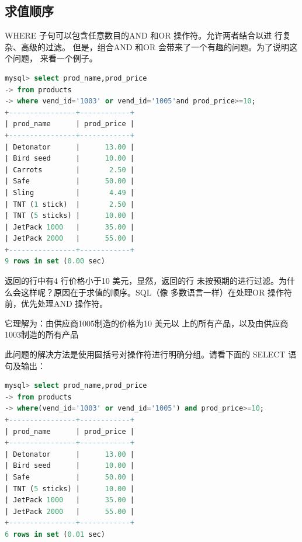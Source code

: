 \documentclass[11pt,a4paper,oneside]{book}
\begin{document}
\subsection{求值顺序}
WHERE 子句可以包含任意数目的AND 和OR 操作符。允许两者结合以进
行复杂、高级的过滤。
但是，组合AND 和OR 会带来了一个有趣的问题。为了说明这个问题，
来看一个例子。

\begin{lstlisting}[language=sql]
mysql> select prod_name,prod_price
-> from products
-> where vend_id='1003' or vend_id='1005'and prod_price>=10;
+----------------+------------+
| prod_name      | prod_price |
+----------------+------------+
| Detonator      |      13.00 |
| Bird seed      |      10.00 |
| Carrots        |       2.50 |
| Safe           |      50.00 |
| Sling          |       4.49 |
| TNT (1 stick)  |       2.50 |
| TNT (5 sticks) |      10.00 |
| JetPack 1000   |      35.00 |
| JetPack 2000   |      55.00 |
+----------------+------------+
9 rows in set (0.00 sec)
\end{lstlisting}
返回的行中有4 行价格小于10 美元，显然，返回的行
未按预期的进行过滤。为什么会这样呢？原因在于求值的顺序。SQL（像
多数语言一样）在处理OR 操作符前，优先处理AND 操作符。

它理解为：由供应商1005制造的价格为10 美元以
上的所有产品，以及由供应商1003制造的所有产品

此问题的解决方法是使用圆括号对操作符进行明确分组。请看下面的
SELECT 语句及输出：
\begin{lstlisting}[language=sql]
mysql> select prod_name,prod_price
-> from products
-> where(vend_id='1003' or vend_id='1005') and prod_price>=10;
+----------------+------------+
| prod_name      | prod_price |
+----------------+------------+
| Detonator      |      13.00 |
| Bird seed      |      10.00 |
| Safe           |      50.00 |
| TNT (5 sticks) |      10.00 |
| JetPack 1000   |      35.00 |
| JetPack 2000   |      55.00 |
+----------------+------------+
6 rows in set (0.01 sec)
\end{lstlisting}
\end{document}
